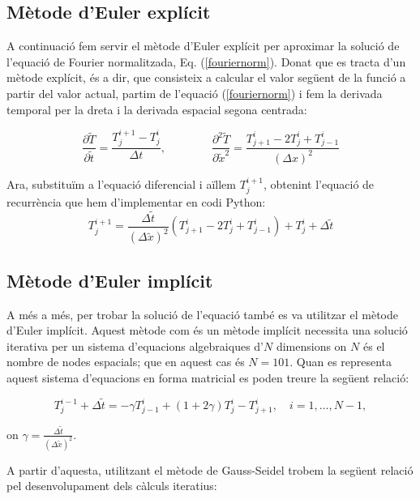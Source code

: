 \documentclass[a4paper,11pt,oneside]{article}
\begin{document}
\subsection{Mètode d'Euler explícit}

A continuació fem servir el mètode d'Euler explícit per aproximar la solució de l'equació de Fourier normalitzada, Eq. (\ref{fouriernorm}). 
Donat que es tracta d'un mètode explícit, és a dir, que consisteix a calcular el valor següent de la funció a partir del valor actual, 
partim de l'equació (\ref{fouriernorm}) i fem la derivada temporal per la dreta i la derivada espacial segona centrada:

\begin{equation*}
    \dfrac{\partial \widetilde{T}}{\partial \widetilde{t}} = \dfrac{T_j^{i+1} - T_j^i}{\Delta t}, \qquad \qquad \dfrac{\partial ^2 \widetilde{T}}{\partial \widetilde{x}^2} = \dfrac{T_{j+1}^i - 2 T_j^i + T_{j-1}^i}{(\Delta x)^2}
\end{equation*}

Ara, substituïm a l'equació diferencial i aïllem $T_j^{i+1}$, obtenint l'equació de recurrència que hem 
d'implementar en codi Python:
\begin{equation}
    T_j^{i+1} = \dfrac{\Delta \widetilde{t}}{(\Delta \widetilde{x})^2}(T_{j+1}^i - 2 T_j^i + T_{j-1}^i) + T_j^i + \Delta \widetilde{t}
\end{equation}


\subsection{Mètode d'Euler implícit}

A més a més, per trobar la solució de l'equació també es va utilitzar el mètode d'Euler implícit. Aquest mètode com és un mètode implícit necessita una solució iterativa per un sistema d'equacions algebraiques d'$N$ dimensions on $N$ és el nombre de nodes espacials; que en aquest cas és $N = 101$. Quan es representa aquest sistema d'equacions en forma matricial es poden treure la següent relació:

\begin{equation}
    \label{Eq:Eul_imp}
    T_j^{i-1} + \Delta\tilde{t} = - \gamma T_{j-1}^i + (1 + 2\gamma) T_j^i - T_{j+1}^i, \quad i = 1, \dots, N -1,
\end{equation}

on $\gamma = \frac{\Delta\tilde{t}}{\left(\Delta\tilde{x}\right)^2}$.

A partir d'aquesta, utilitzant el mètode de Gauss-Seidel trobem la següent relació pel desenvolupament dels càlculs iteratius:
\end{document}
